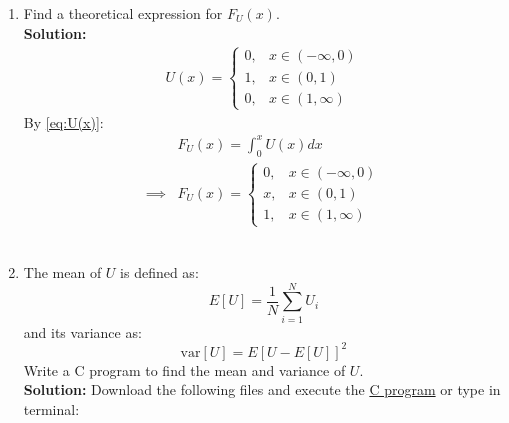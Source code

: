 \documentclass[journal,12pt,onecolumn]{IEEEtran}
\numberwithin{equation}{section}
\renewcommand\thesection{\arabic{section}}
\providecommand{\sbrak}[1]{\ensuremath{{}\left[#1\right]}}
\providecommand{\gitlink}[2]{{\color{blue}\href{https://github.com/SterbenVD/AI1110-Assignments/blob/main/Assignment\%20-\%20Random\%20Numbers/#1}{#2}}}
\newcommand{\solution}{\noindent \textbf{Solution: }}
\begin{document}
\begin{enumerate}[label=\thesection.\arabic*,ref=\thesection.\theenumi]
\begin{figure}[H]
              \label{fig:1_cdf}
          \end{figure}
          \solution  The following \gitlink{codes/1-2.py}{python code} plots Fig. \ref{fig:1_cdf} or type in terminal:
          \begin{lstlisting}
wget https://github.com/SterbenVD/AI1110-Assignments/blob/main/Assignment\%20-\%20Random\%20Numbers/codes/1-2.py
            \end{lstlisting}
    \item Find a  theoretical expression for $F_{U}(x)$.
          \\
          \solution
          \begin{align}
              \label{eq:U(x)}
              U(x) =
              \begin{cases}
                  0, & x \in (-\infty,0)
                  \\
                  1, & x \in (0,1)
                  \\
                  0, & x \in (1, \infty)
              \end{cases}
          \end{align}
          By \eqref{eq:U(x)}:
          \begin{align}
                       & F_U(x) = \int_0^x U(x) dx
              \\
              \implies & F_U(x) =
              \begin{cases}
                  0, & x \in (-\infty,0)
                  \\
                  x, & x \in (0,1)
                  \\
                  1, & x \in (1, \infty)
              \end{cases}
          \end{align}
          \\
    \item
          The mean of $U$ is defined as:
          \begin{equation}
              E\sbrak{U} = \dfrac{1}{N}\sum_{i=1}^{N}U_i
          \end{equation}
          and its variance as:
          \begin{equation}
              \text{var}\sbrak{U} = E\sbrak{U- E\sbrak{U}}^2
          \end{equation}
          Write a C program to  find the mean and variance of $U$.
          \\
          \solution Download the following files and execute the \gitlink{codes/1-4.c}{C program} or type in terminal:

\end{enumerate}
\end{document}
